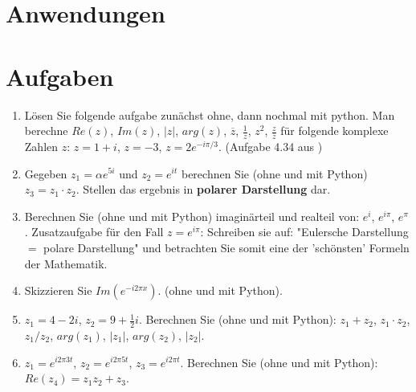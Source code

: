
\section{Anwendungen}\label{sec:anwendungen}


\section{Aufgaben}
\begin{enumerate}
\item Lösen Sie folgende aufgabe zunächst ohne, dann nochmal mit python. Man berechne $Re(z)$, $Im(z)$, $|z|$, $arg(z)$, $\overline{z}$, $\frac{1}{z}$, $z^2$, $\frac{z}{\overline{z}}$ für folgende komplexe Zahlen $z$: $z=1+i$, $z=-3$, $z=2e^{-i\pi/3}$. (Aufgabe 4.34 aus \cite{merziger2024repetitorium})

\item Gegeben $z_1 = \alpha e^{5i}$ und $z_2 = e^{it}$ berechnen Sie (ohne und mit Python) $z_3 = z_1 \cdot z_2$. Stellen das ergebnis in \textbf{polarer Darstellung} dar. 

\item Berechnen Sie (ohne und mit Python) imaginärteil und realteil von: $e^i$, $e^{i\pi}$, $e^{\pi}$. Zusatzaufgabe für den Fall $z=e^{i\pi}$: Schreiben sie auf: "Eulersche Darstellung $=$ polare Darstellung" und betrachten Sie somit eine der 'schönsten' Formeln der Mathematik.

\item Skizzieren Sie $Im(e^{-i 2\pi x})$. (ohne und mit Python).

\item $z_1 = 4-2i$, $z_2 = 9+\frac{1}{2}i$. Berechnen Sie (ohne und mit Python): $z_1 + z_2$, $z_1 \cdot z_2$, $z_1 / z_2$, $arg(z_1)$, $|z_1|$, $arg(z_2)$, $|z_2|$.

\item $z_1 = e^{ i 2\pi 3 t}$, $z_2 = e^{ i 2\pi 5 t}$, $z_3 = e^{ i 2\pi t}$. Berechnen Sie (ohne und mit Python): $Re(z_4) = z_1 z_2 + z_3$.



\end{enumerate}


